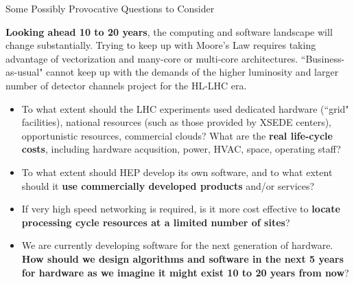 \documentclass[compress,10]{beamer}
\begin{document}
\begin{frame}{Some Possibly Provocative Questions to Consider
}{}
{\footnotesize
\textcolor{brickred}{\bf Looking ahead 10 to 20 years}, 
the computing and software landscape
will change substantially.
Trying to keep up with Moore's Law requires taking advantage of
vectorization and many-core or multi-core architectures.
``Business-as-usual" cannot keep up with the demands of the
higher luminosity and larger number of detector channels
project for the HL-LHC era.
\begin{itemize}
  \item
    To what extent should the LHC experiments used dedicated hardware
    (``grid" facilities), national resources (such as those provided
    by XSEDE centers), opportunistic resources, commercial clouds?
    What are the \textcolor{brickred}{\bf real life-cycle costs}, 
    including hardware acqusition,
    power, HVAC, space, operating staff?
  \item
    To what extent should HEP develop its own software, and to what 
    extent should it 
    \textcolor{brickred}{\bf use commercially developed products}
    and/or
    services?
  \item
    If very high speed networking is required, is it 
    more cost effective to \textcolor{brickred}{\bf locate
    processing cycle resources at a limited number of sites}?
  \item
    We are currently developing software for the next generation of 
    hardware.  \textcolor{brickred}{\bf How should we design algorithms 
    and software 
    in the next 5 years
    for hardware as we imagine it might exist 10 to 20 years
    from now}?
\end{itemize}
}  %

\end{frame}
\end{document}
